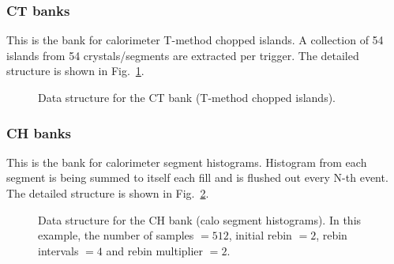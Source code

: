\subsubsection*{CT banks}

This is the bank for calorimeter T-method chopped islands. A collection of 54 islands from 54 crystals/segments are extracted per trigger. The detailed structure is shown in Fig.~\ref{fig:CTBankFormat}.

\begin{figure}[htbp]
\centering
{}
\caption{Data structure for the CT bank (T-method chopped islands).}\label{fig:CTBankFormat}
\end{figure}

\subsubsection*{CH banks}

This is the bank for calorimeter segment histograms. Histogram from each segment is being summed to itself each fill and is flushed out every N-th event. The detailed structure is shown in Fig.~\ref{fig:CHBankFormat}.

\begin{figure}[htbp]
\centering
{}
\caption{Data structure for the CH bank (calo segment histograms). In this example, the number of samples $= 512$, initial rebin $= 2$, rebin intervals $=4$ and rebin multiplier $=2$.}\label{fig:CHBankFormat}
\end{figure}

